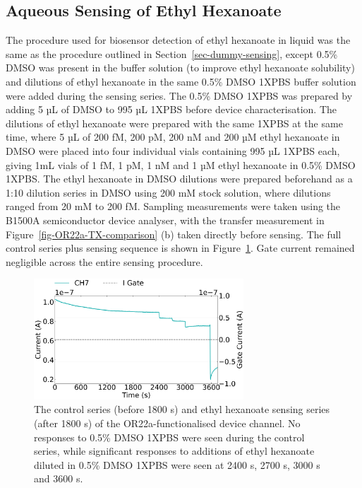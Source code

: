 \documentclass[
  a4paper,
]{scrbook}
\begin{document}
\hypertarget{aqueous-sensing-of-ethyl-hexanoate}{%
\subsection{Aqueous Sensing of Ethyl
Hexanoate}\label{aqueous-sensing-of-ethyl-hexanoate}}

The procedure used for biosensor detection of ethyl hexanoate in liquid
was the same as the procedure outlined in
Section~\ref{sec-dummy-sensing}, except 0.5\% DMSO was present in the
buffer solution (to improve ethyl hexanoate solubility) and dilutions of
ethyl hexanoate in the same 0.5\% DMSO 1XPBS buffer solution were added
during the sensing series. The 0.5\% DMSO 1XPBS was prepared by adding 5
µL of DMSO to 995 µL 1XPBS before device characterisation. The dilutions
of ethyl hexanoate were prepared with the same 1XPBS at the same time,
where 5 µL of 200 fM, 200 pM, 200 nM and 200 µM ethyl hexanoate in DMSO
were placed into four individual vials containing 995 µL 1XPBS each,
giving 1mL vials of 1 fM, 1 pM, 1 nM and 1 µM ethyl hexanoate in 0.5\%
DMSO 1XPBS. The ethyl hexanoate in DMSO dilutions were prepared
beforehand as a 1:10 dilution series in DMSO using 200 mM stock
solution, where dilutions ranged from 20 mM to 200 fM. Sampling
measurements were taken using the B1500A semiconductor device analyser,
with the transfer measurement in Figure~\ref{fig-OR22a-TX-comparison}
(b) taken directly before sensing. The full control series plus sensing
sequence is shown in Figure~\ref{fig-EtHex-aqueous-sensing}. Gate
current remained negligible across the entire sensing procedure.

\begin{figure}

{\centering \includegraphics[width=0.7\textwidth,height=\textheight]{figures/ch8/Q1C6.png}

}

\caption{\label{fig-EtHex-aqueous-sensing}The control series (before
1800 s) and ethyl hexanoate sensing series (after 1800 s) of the
OR22a-functionalised device channel. No responses to 0.5\% DMSO 1XPBS
were seen during the control series, while significant responses to
additions of ethyl hexanoate diluted in 0.5\% DMSO 1XPBS were seen at
2400 s, 2700 s, 3000 s and 3600 s.}

\end{figure}
\end{document}
